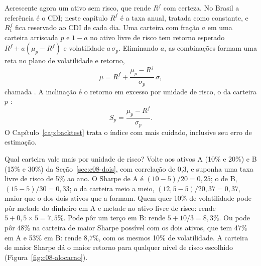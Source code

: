 Acrescente agora um ativo sem risco, que rende $R^f$ com certeza. No Brasil a referência é o CDI; neste capítulo $R^f$ é a taxa anual, tratada como constante, e $R^f_t$ fica reservado ao CDI de cada dia. Uma carteira com fração $a$ em uma carteira arriscada $p$ e $1-a$ no ativo livre de risco tem retorno esperado $R^f + a(\mu_p - R^f)$ e volatilidade $a\,\sigma_p$. Eliminando $a$, as combinações formam uma reta no plano de volatilidade e retorno,
\begin{equation}
  \mu = R^f + \frac{\mu_p - R^f}{\sigma_p}\,\sigma ,
  \label{eq:c08-cal}
\end{equation}
chamada . A inclinação é o retorno em excesso por unidade de risco, o  da carteira $p$ \citep{sharpe1966}:
\begin{equation}
  S_p = \frac{\mu_p - R^f}{\sigma_p} .
  \label{eq:c08-sharpe}
\end{equation}
O Capítulo~\ref{cap:backtest} trata o índice com mais cuidado, inclusive seu erro de estimação.

\begin{exemplo}{Qual carteira vale mais por unidade de risco?}
Volte aos ativos A (10\% e 20\%) e B (15\% e 30\%) da Seção~\ref{sec:c08-dois}, com correlação de 0,3, e suponha uma taxa livre de risco de 5\% ao ano. O Sharpe de A é $(10 - 5)/20 = 0,25$; o de B, $(15 - 5)/30 = 0,33$; o da carteira meio a meio, $(12,5 - 5)/20,37 = 0,37$, maior que o dos dois ativos que a formam. Quem quer 10\% de volatilidade pode pôr metade do dinheiro em A e metade no ativo livre de risco: rende $5 + 0,5 \times 5 = 7,5\%$. Pode pôr um terço em B: rende $5 + 10/3 = 8,3\%$. Ou pode pôr 48\% na carteira de maior Sharpe possível com os dois ativos, que tem 47\% em A e 53\% em B: rende 8,7\%, com os mesmos 10\% de volatilidade. A carteira de maior Sharpe dá o maior retorno para qualquer nível de risco escolhido (Figura~\ref{fig:c08-alocacao}).
\end{exemplo}


